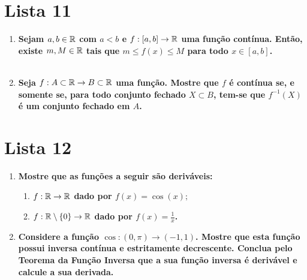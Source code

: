 \documentclass[%
  a4paper,%
  12pt,%
  fleqn,%
  english,%
  brazilian,%
]{article}
\begin{document}
\newpage
\section*{Lista 11}


\begin{enumerate}[wide, labelwidth=!, labelindent=0pt]
    \setcounter{enumi}{0}
  \item \textbf{Sejam $a, b \in \mathbb R$ com $a<b$ e $f:[a, b] \rightarrow \mathbb R$ uma função contínua.
    Então, existe $m, M \in \mathbb R$ tais que $m\le f(x) \le M$ para todo $x \in [a,b]$.}\\
    \\
    \setcounter{enumi}{3}
  \item \textbf{Seja $f: A \subset \mathbb R \rightarrow B \subset \mathbb R$ uma função. Mostre que $f$ é contínua se,
    e somente se, para todo conjunto fechado $X \subset B$, tem-se que $f^{-1}(X)$ é um conjunto fechado
    em $A$.}\\
\end{enumerate}
\newpage
\section*{Lista 12}
\begin{enumerate}[wide, labelwidth=!, labelindent=0pt]
    \setcounter{enumi}{0}
  \item \textbf{Mostre que as funções a seguir são deriváveis:}
    \begin{enumerate}[label=\alph*)]
      \item \textbf{$f: \mathbb R \rightarrow \mathbb R$ dado por $f(x) = \cos (x);$}\\
      \item \textbf{$f: \mathbb R \setminus \{0\} \rightarrow \mathbb R$ dado por $f(x) = \frac{1}{x}$.}\\
    \end{enumerate}
    \setcounter{enumi}{3}
      \vspace{3mm}
    \item \textbf{Considere a função $\cos: (0, \pi) \rightarrow (-1, 1)$. Mostre que esta função possui inversa
      contínua e estritamente decrescente. Conclua pelo Teorema da Função Inversa que a sua função inversa é
      derivável e calcule a sua derivada.}\\
    \\
\end{enumerate}
\end{document}
